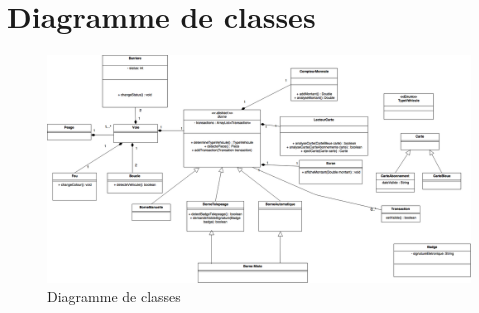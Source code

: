 \label{Cap:TD3}
\section{Diagramme de classes}

\begin{figure}[!htb]
    \centering
    \includegraphics[scale=0.4, angle = 90]{02_Desenvolvimento/TD2/images/DiagrammeClasse.png}
    \caption{Diagramme de classes}
    \label{fig:DARentrer}
\end{figure}